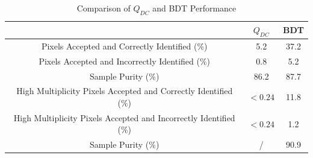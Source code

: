 \documentclass[]{article}
\begin{document}
\begin{table}[h!]
  \centering
  \caption{Comparison of $Q_{DC}$ and BDT Performance}
  \label{tab:table3}
  \begin{tabular}{ccc}
    \toprule
    & $Q_{DC}$ & BDT\\
    \midrule
    Pixels Accepted and Correctly Identified (\%) & 5.2 & 37.2\\
   Pixels Accepted and Incorrectly Identified (\%) & 0.8 & 5.2\\
    Sample Purity (\%) & 86.2 & 87.7 \\
    \midrule
    High Multiplicity Pixels Accepted and Correctly Identified (\%) & $<0.24$ & 11.8\\
    High Multiplicity Pixels Accepted and Incorrectly Identified (\%) & $<0.24$ & 1.2\\
    Sample Purity (\%) & / & 90.9\\
    \bottomrule
  \end{tabular}
\end{table}
\end{document}
